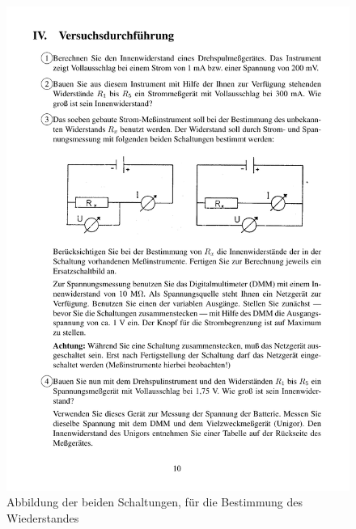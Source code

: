 \documentclass[12pt]{scrartcl}
\begin{document}
\begin{enumerate}
	\begin{figure}[htbp] 
	  \centering
	    \includegraphics[trim = 20mm 107mm 20mm 60mm, clip, scale = 1]{abb_versuch_3.pdf}
	  	\caption[Abbildung der beiden Schaltungen, für die Bestimmung des Wiederstandes]{Abbildung der beiden Schaltungen, für die Bestimmung des Wiederstandes\footnotemark}
	  \label{fig:abb_versuch_3}
	\end{figure}
	

\end{enumerate}
\end{document}

